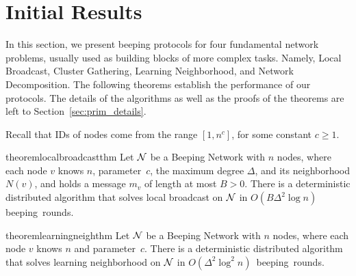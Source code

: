 \vspace*{-1ex}
\section{Initial Results}
\label{sec:primitives}

In this section, we present beeping protocols for four fundamental network problems, usually used as building blocks of more complex tasks. Namely, Local Broadcast, Cluster Gathering, Learning Neighborhood, and Network Decomposition. 
%
The following theorems establish the performance of our protocols. The details of the algorithms as well as the proofs of the theorems are left to Section~\ref{sec:prim_details}.

Recall that IDs of nodes come from the range $[1,n^c]$, for some constant $c \geq 1$.

\begin{restatable}[]{theorem}{localbroadcastthm} %
\label{th:local_broadcast}
    Let $\mathcal{N}$ be a Beeping Network with 
    $n$ nodes, where each node 
    $v$
    knows $n$, parameter~$c$, the maximum degree $\Delta$, and its neighborhood $N(v)$, and holds a message $m_v$ of length at most $B>0$.
    There is a deterministic distributed algorithm that solves local broadcast on $\mathcal{N}$ in $O(B\Delta^2 \log n)$ beeping~rounds.
\end{restatable}

\vspace*{-1.5ex}
\begin{restatable}[]{theorem}{learningneighthm} %
\label{th:learning_neighbourhood}
    Let $\mathcal{N}$ be a Beeping Network with 
    $n$ nodes, where each node 
    $v$
    knows $n$ and parameter~$c$.
    There is a deterministic distributed algorithm that solves learning neighborhood  on $\mathcal{N}$ in $O(\Delta^2 \log^2 n)$~beeping~rounds.
\end{restatable}

